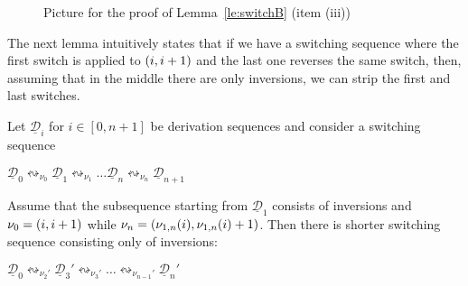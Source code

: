 \documentclass[a4paper,UKenglish,cleveref,pdftex,thm-restate,numberwithinsect,anonymous]{lipics}
\newcommand{\interval}[2][1]{\ensuremath{[{#1},{#2}]}}
\newcommand{\dder}[1]{\mathscr{#1}}
\newcommand{\der}[1]{\underline{\dder{#1}}}
\newcommand{\shift}[1]{\ensuremath{\mathrel{{\leftrightsquigarrow}_{#1}}}}
\begin{document}
\begin{figure}
  \caption{Picture for the proof of Lemma~\ref{le:switchB} (item (iii))}
  \label{fi:switchB2}
\end{figure}

The next lemma intuitively states that if we have a switching sequence
where the first switch is applied to $\transp{i}$ and the last one
reverses the same switch, then, assuming that in the middle there are
only inversions, we can strip the first and last switches.

\begin{lemma}
  \label{le:switchC}
  Let $\der{D}_i$ for $i \in \interval[0]{n+1}$ be derivation sequences
  and consider a switching sequence
  \begin{center}
    $\der{D}_0 \shift{\nu_0} \der{D}_1 \shift{\nu_1} \ldots
     \der{D}_n \shift{\nu_n} \der{D}_{n+1}$
  \end{center}
  Assume that the subsequence starting from $\der{D}_1$ consists of
  inversions and $\nu_0=\transp{i}$ while
  $\nu_n = \transp{\nu_{1,n}(i)}$.  Then there is shorter switching sequence
  consisting only of inversions:
  \begin{center}
    $\der{D}_0 \shift{\nu_2'} \der{D}_3' \shift{\nu_3'} \ldots
    \shift{\nu_{n-1}'} \der{D}_n'$
  \end{center}
\end{lemma}
\end{document}
